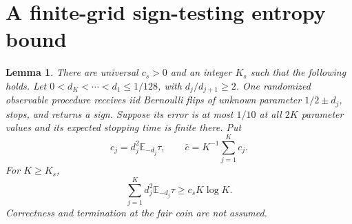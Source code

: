 \documentclass[11pt]{article}
\newtheorem{lemma}[theorem]{Lemma}
\newcommand{\E}{\mathbb E}
\begin{document}
\section{A finite-grid sign-testing entropy bound}
\begin{lemma}\label{lem:sign}
There are universal $c_s>0$ and an integer $K_s$ such that the following holds.
Let $0<d_K<\cdots<d_1\le1/128$, with $d_j/d_{j+1}\ge2$.
One randomized observable procedure receives iid Bernoulli flips of unknown
parameter $1/2\pm d_j$, stops, and returns a sign. Suppose its error is at most
$1/10$ at all $2K$ parameter values and its expected stopping time is finite
there. Put
\[
 c_j=d_j^2\E_{-d_j}\tau,\qquad \bar c=K^{-1}\sum_{j=1}^Kc_j.
\]
For $K\ge K_s$,
\[
 \sum_{j=1}^K d_j^2\E_{-d_j}\tau\ge c_sK\log K.          \tag{2}
\]
Correctness and termination at the fair coin are not assumed.
\end{lemma}
\end{document}
